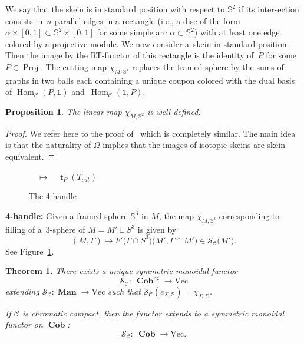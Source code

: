 \documentclass[10pt,a4paper]{amsart}
\newtheorem{theorem}{Theorem}
\newtheorem{proposition}{Proposition}
\numberwithin{equation}{section}
\newcommand{\Proj}{\operatorname{Proj}}
\numberwithin{theorem}{section}
\numberwithin{proposition}{section}
\numberwithin{definition}{section}
\numberwithin{lemma}{section}
\numberwithin{corollary}{section}
\numberwithin{remark}{section}
\numberwithin{example}{section}
\newcommand{\cat}{\mathcal{C}}
\newcommand{\Hom}{\operatorname{Hom}}
\newcommand{\unit}{\ensuremath{\mathds{1}}}
\newcommand{\mt}{{\operatorname{\mathsf{t}}}}
\newcommand{\TSkein}{{\mathscr{S}}}
\newcommand{\Vect}{\mathrm{Vec}}
\newcommand{\cob}{\operatorname{\textbf{Cob}}}
\newcommand{\nc}[1]{{#1^{\mathsf{nc}}}}
\newcommand{\man}{\operatorname{\textbf{Man}}}
\newcommand{\Sp}{\mathbb{S}}
\begin{document}
We say that the skein is in standard position with respect to $\Sp^2$ if its
intersection consists in~$n$ parallel edges in a rectangle \big(i.e., a disc of the form $\alpha\times [0,1]\subset \Sp^2\times [0,1]$ for some simple arc $\alpha\subset \Sp^2$\big) with at
least one edge colored by a projective module. We
now consider a~skein in standard position. Then the image by the
RT-functor of this rectangle is the identity of~$P$ for some
$P\in\Proj$. The cutting map $\chi_{M,\Sp^2}$ replaces the framed
sphere by the sums of graphs in two balls each containing a unique coupon
 colored with the dual basis of $\Hom_\cat(P,\unit)$ and~$\Hom_\cat(\unit,P)$.
\begin{proposition}
 The linear map $\chi_{M,\Sp^2}$ is well defined.
\end{proposition}
\begin{proof}
 We refer here to the proof of~\cite[Lemma 3.3]{CGPV2023a}
 which is completely similar. The main idea is that the naturality of
 $\Omega$ implies that the images of isotopic skeins are skein
 equivalent.
\end{proof}

\begin{figure}[t]
 \centering
{} $\quad \mapsto \quad \mt_P(T_{cut})$
\caption{The 4-handle}
 \label{fig:4handle}
\end{figure}
\textbf{4-handle:} Given a framed sphere $\Sp^3$ in $M$, the map $\chi_{M,\Sp^3}$ corresponding to
filling of a~3-sphere of $M=M'\sqcup S^3$ is given by
\[(M,\Gamma)\mapsto F'\bigl(\Gamma\cap S^3\bigr)\bigl(M',\Gamma\cap M'\bigr)\in\TSkein_\cat\bigl(M'\bigr).\]
See Figure~\ref{fig:4handle}.


\begin{theorem}\label{T:S}
 There exists a unique symmetric monoidal functor{\samepage
 \[
 \TSkein_\cat\colon\ \nc\cob\to\Vect
 \]
 extending $\TSkein_\cat\colon \man\to\Vect$
 such that $\TSkein_\cat(e_{\Sigma,\Sp})=\chi_{\Sigma,\Sp}$.}

 If $\cat$ is chromatic compact, then the functor extends to a symmetric monoidal functor on $\cob$:
 \[
 \TSkein_\cat\colon\ \cob\to\Vect.
 \]
\end{theorem}
\end{document}
